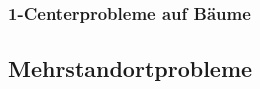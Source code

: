         \subsubsection{1-Centerprobleme auf Bäume} %
        \label{ssub:1_centerprobleme_auf_b_ume}
        


      \subsection{Mehrstandortprobleme} %
      \label{sub:mehrstandortprobleme}
      
    
